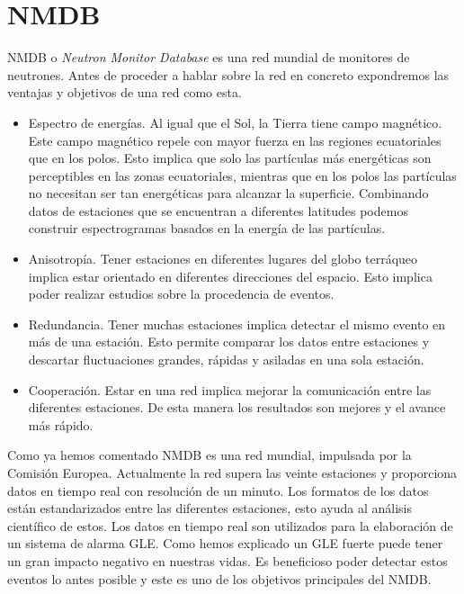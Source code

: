 \section{NMDB}
	NMDB\cite{NMDB2011} o \emph{Neutron Monitor Database} es una red mundial de monitores de neutrones. Antes de proceder a hablar sobre la red en
	concreto expondremos las ventajas y objetivos de una red como esta.
	\begin{itemize}
		\item 	Espectro de energías. Al igual que el Sol, la Tierra tiene campo magnético. Este campo magnético repele con mayor fuerza en
		  	las regiones ecuatoriales que en los polos. Esto implica que solo las partículas más energéticas son perceptibles en las
			zonas ecuatoriales, mientras que en los polos las partículas no necesitan ser tan energéticas para alcanzar la superficie.
			Combinando datos de estaciones que se encuentran a diferentes latitudes podemos construir espectrogramas basados en la energía
			de las partículas.
		\item 	Anisotropía. Tener estaciones en diferentes lugares del globo terráqueo implica estar orientado en diferentes direcciones del
		  	espacio. Esto implica poder realizar estudios sobre la procedencia de eventos.
		\item 	Redundancia. Tener muchas estaciones implica detectar el mismo evento en más de una estación. Esto permite comparar los datos
		  	entre estaciones y descartar fluctuaciones grandes, rápidas y asiladas en una sola estación.
		\item 	Cooperación. Estar en una red implica mejorar la comunicación entre las diferentes estaciones. De esta manera los resultados
		  	son mejores y el avance más rápido. 
	\end{itemize}
	\par
	Como ya hemos comentado NMDB es una red mundial, impulsada por la Comisión Europea. Actualmente la red supera las veinte estaciones y
	proporciona datos en tiempo real con resolución de un minuto. Los formatos de los datos están estandarizados entre las diferentes estaciones,
	esto ayuda al análisis científico de estos. Los datos en tiempo real son utilizados para la elaboración de un sistema de alarma
	GLE\cite{GleAlarm}. Como hemos explicado un GLE fuerte puede tener un gran impacto negativo en nuestras vidas. Es beneficioso poder detectar
	estos eventos lo antes posible y este es uno de los objetivos principales del NMDB. 

